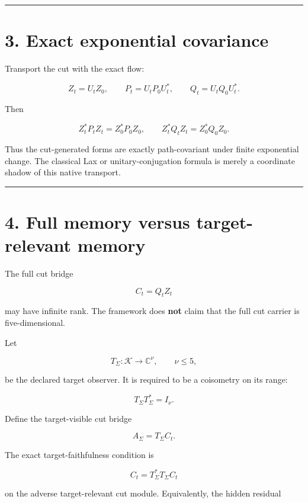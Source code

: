 \begin{center}\rule{0.5\linewidth}{0.5pt}\end{center}

\hypertarget{exact-exponential-covariance}{%
\section{3. Exact exponential covariance}\label{exact-exponential-covariance}}

Transport the cut with the exact flow:

\[
Z_t=U_tZ_0,
\qquad
P_t=U_tP_0U_t^*,
\qquad
Q_t=U_tQ_0U_t^*.
\]

Then

\[
Z_t^*P_tZ_t=Z_0^*P_0Z_0,
\qquad
Z_t^*Q_tZ_t=Z_0^*Q_0Z_0.
\]

Thus the cut-generated forms are exactly path-covariant under finite exponential
change. The classical Lax or unitary-conjugation formula is merely a coordinate
shadow of this native transport.

\begin{center}\rule{0.5\linewidth}{0.5pt}\end{center}

\hypertarget{full-memory-versus-target-relevant-memory}{%
\section{4. Full memory versus target-relevant memory}\label{full-memory-versus-target-relevant-memory}}

The full cut bridge

\[
C_t=Q_tZ_t
\]

may have infinite rank. The framework does \textbf{not} claim that the full cut
carrier is five-dimensional.

Let

\[
T_\Sigma:\mathcal K\longrightarrow\mathbb C^\nu,
\qquad
\nu\le5,
\]

be the declared target observer. It is required to be a coisometry on its
range:

\[
T_\Sigma T_\Sigma^*=I_\nu.
\]

Define the target-visible cut bridge

\[
A_\Sigma=T_\Sigma C_t.
\]

The exact target-faithfulness condition is

\[
\boxed{C_t=T_\Sigma^*T_\Sigma C_t}
\]

on the adverse target-relevant cut module. Equivalently, the hidden residual

